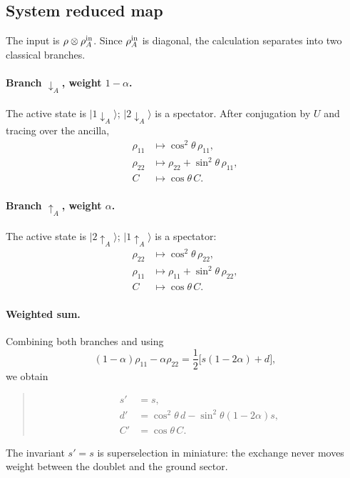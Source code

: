 \documentclass[11pt,a4paper]{article}
\newcommand{\ket}[1]{|#1\rangle}
\newenvironment{resultbox}{\begin{quote}\small\color{blue!40!black}}{\end{quote}}
\begin{document}
\subsection{System reduced map}

The input is $\rho\otimes\rho_A^{\rm in}$. Since $\rho_A^{\rm in}$ is diagonal, the calculation separates into two classical branches.

\paragraph{Branch $\downarrow_A$, weight $1-\alpha$.}
The active state is $\ket{1\downarrow_A}$; $\ket{2\downarrow_A}$ is a spectator. After conjugation by $U$ and tracing over the ancilla,
\begin{align}
\rho_{11}&\mapsto \cos^2\theta\,\rho_{11},\\
\rho_{22}&\mapsto \rho_{22}+\sin^2\theta\,\rho_{11},\\
C&\mapsto \cos\theta\,C.
\end{align}

\paragraph{Branch $\uparrow_A$, weight $\alpha$.}
The active state is $\ket{2\uparrow_A}$; $\ket{1\uparrow_A}$ is a spectator:
\begin{align}
\rho_{22}&\mapsto \cos^2\theta\,\rho_{22},\\
\rho_{11}&\mapsto \rho_{11}+\sin^2\theta\,\rho_{22},\\
C&\mapsto \cos\theta\,C.
\end{align}

\paragraph{Weighted sum.}
Combining both branches and using
\begin{equation}
(1-\alpha)\rho_{11}-\alpha\rho_{22}
=\frac12\big[s(1-2\alpha)+d\big],
\end{equation}
we obtain
\begin{resultbox}
\begin{align}
s'&=s,\\
d'&=\cos^2\theta\,d-\sin^2\theta(1-2\alpha)s,\\
C'&=\cos\theta\,C.
\end{align}
\end{resultbox}
The invariant $s'=s$ is superselection in miniature: the exchange never moves weight between the doublet and the ground sector.
\end{document}

